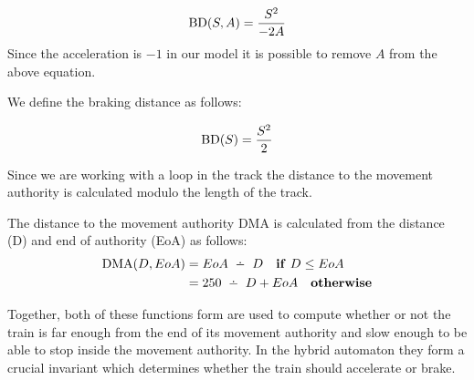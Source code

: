 $$\mathrm{BD}(S,A) = \frac{S^2}{-2A} $$
Since the acceleration is  $-1$ in our model it is possible to remove $A$ from the above equation.

\begin{mydef}
We define the braking distance as follows:

$$\mathrm{BD}(S) = \frac{S^2}{2}$$

\end{mydef}
\medskip
Since we are working with a loop in the track the distance to the movement authority is calculated modulo the length of the track. 
\medskip

\begin{mydef}

The distance to the movement authority $\mathrm{DMA}$ is calculated from the distance (D) and end of authority (EoA) as follows:
\begin{align*}
\DMA{D}{EoA} & = EoA \Monus D \quad \mathbf{if} \ D \leq EoA \\
                         & = 250 \Monus D + EoA \quad \mathbf{otherwise}
\end{align*}

\end{mydef}

Together, both of these functions form are used to compute whether or not the train is far enough from the end of its movement authority and slow enough to be able to stop inside the movement authority. In the hybrid automaton they form a crucial invariant which determines whether the train should accelerate or brake.



